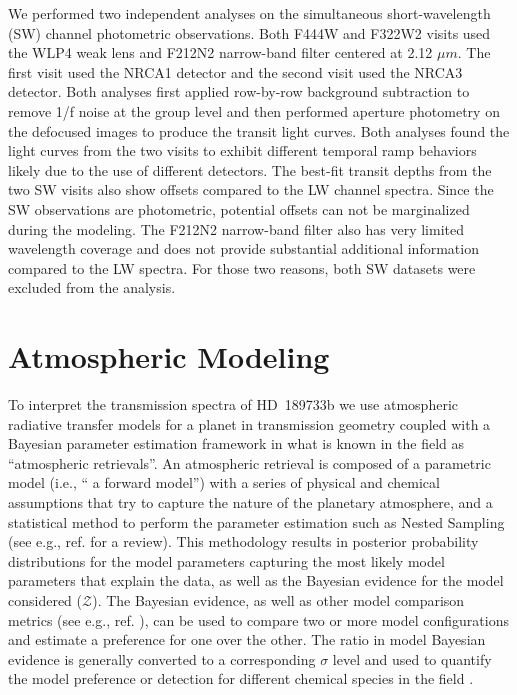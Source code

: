 \documentclass[sn-standardnature]{sn-jnl}%
\begin{document}
We performed two independent analyses on the simultaneous short-wavelength (SW) channel photometric observations. Both F444W and F322W2 visits used the WLP4 weak lens and F212N2 narrow-band filter centered at 2.12 $\mu m$. The first visit used the NRCA1 detector and the second visit used the NRCA3 detector. Both analyses first applied row-by-row background subtraction to remove 1/f noise at the group level and then performed aperture photometry on the defocused images to produce the transit light curves. Both analyses found the light curves from the two visits to exhibit different temporal ramp behaviors likely due to the use of different detectors. The best-fit transit depths from the two SW visits also show offsets compared to the LW channel spectra. Since the SW observations are photometric, potential offsets can not be marginalized during the modeling. The F212N2 narrow-band filter also has very limited wavelength coverage and does not provide substantial additional information compared to the LW spectra. For those two reasons, both SW datasets were excluded from the analysis. \\



\section*{Atmospheric Modeling}

To interpret the transmission spectra of HD~189733b we use atmospheric radiative transfer models for a planet in transmission geometry coupled with a Bayesian parameter estimation framework in what is known in the field as ``atmospheric retrievals''. An atmospheric retrieval is composed of a parametric model (i.e., `` a forward model'') with a series of physical and chemical assumptions that try to capture the nature of the planetary atmosphere, and a statistical method to perform the parameter estimation such as Nested Sampling  (see e.g., ref.  for a review). This methodology results in posterior probability distributions for the model parameters capturing the most likely model parameters that explain the data, as well as the Bayesian evidence for the model considered ($\mathcal{Z}$). The Bayesian evidence, as well as other model comparison metrics (see e.g., ref. ), can be used to compare two or more model configurations and estimate a preference for one over the other. The ratio in model Bayesian evidence is generally converted to a corresponding $\sigma$ level and used to quantify the model preference or detection for different chemical species in the field .
\end{document}
